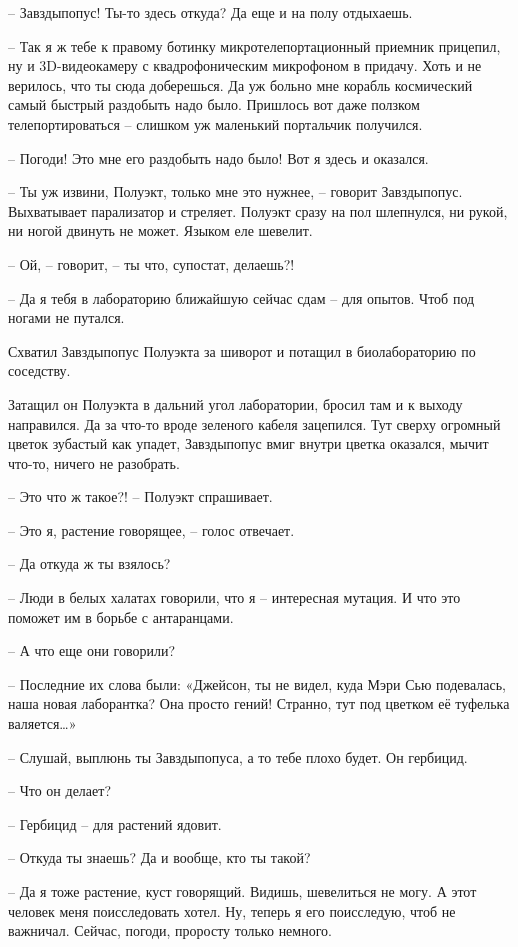 \documentclass[ebook,oneside,final,openright]{memoir}
\begin{document}
– Завздыпопус! Ты-то здесь откуда? Да еще и на полу отдыхаешь.\par
– Так я ж тебе к правому ботинку микротелепортационный приемник прицепил, ну и 3D-видеокамеру с квадрофоническим микрофоном в придачу. Хоть и не верилось, что ты сюда доберешься. Да уж больно мне корабль космический самый быстрый раздобыть надо было. Пришлось вот даже ползком телепортироваться – слишком уж маленький портальчик получился.\par
– Погоди! Это мне его раздобыть надо было! Вот я здесь и оказался.\par
– Ты уж извини, Полуэкт, только мне это нужнее, – говорит Завздыпопус. Выхватывает парализатор и стреляет. Полуэкт сразу на пол шлепнулся, ни рукой, ни ногой двинуть не может. Языком еле шевелит.\par
– Ой, – говорит, – ты что, супостат, делаешь?!\par
– Да я тебя в лабораторию ближайшую сейчас сдам – для опытов. Чтоб под ногами не путался.\par
Схватил Завздыпопус Полуэкта за шиворот и потащил в биолабораторию по соседству.\par
\par
Затащил он Полуэкта в дальний угол лаборатории, бросил там и к выходу направился. Да за что-то вроде зеленого кабеля зацепился. Тут сверху огромный цветок зубастый как упадет, Завздыпопус вмиг внутри цветка оказался, мычит что-то, ничего не разобрать.\par
\par
– Это что ж такое?! – Полуэкт спрашивает.\par
– Это я, растение говорящее, – голос отвечает.\par
– Да откуда ж ты взялось?\par
– Люди в белых халатах говорили, что я – интересная мутация. И что это поможет им в борьбе с антаранцами.\par
– А что еще они говорили?\par
– Последние их слова были: «Джейсон, ты не видел, куда Мэри Сью подевалась, наша новая лаборантка? Она просто гений! Странно, тут под цветком её туфелька валяется…»\par
– Слушай, выплюнь ты Завздыпопуса, а то тебе плохо будет. Он гербицид.\par
– Что он делает?\par
– Гербицид – для растений ядовит.\par
– Откуда ты знаешь? Да и вообще, кто ты такой?\par
– Да я тоже растение, куст говорящий. Видишь, шевелиться не могу. А этот человек меня поисследовать хотел. Ну, теперь я его поисследую, чтоб не важничал. Сейчас, погоди, проросту только немного.\par
\end{document}
